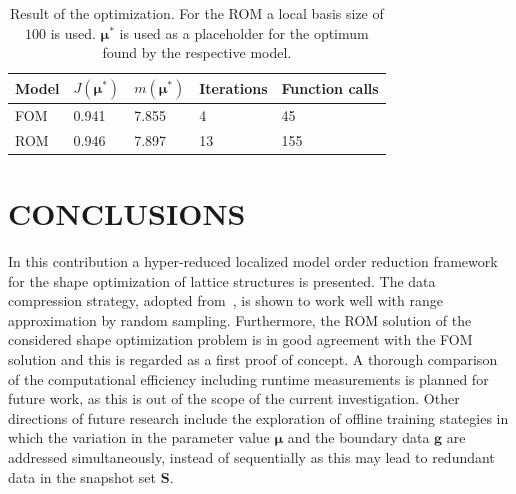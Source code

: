 \documentclass[a4paper]{eccomas_paper-2024}
\newcommand{\m}{\bm\mu}
\begin{document}
\begin{table}
    \caption{Result of the optimization. For the ROM a local basis size of $100$ is used. $\m^{\ast}$ is used as a placeholder for the optimum found by the respective model.}\label{tab:opt_result}
    \begin{center}
        \begin{tabularx}{\textwidth}{XXXXX}
            \toprule
            Model & $J(\m^{\ast})$ & $m(\m^{\ast})$ & Iterations & Function calls\\\midrule
            FOM   &  0.941         &  7.855  & 4          & 45\\
            ROM   &  0.946         &  7.897  & 13         & 155\\
            \bottomrule
        \end{tabularx}
    \end{center}
\end{table}


\section{CONCLUSIONS} %
\label{sec:conclusions}
In this contribution a hyper-reduced localized model order reduction framework for the shape optimization of lattice structures is presented.
The data compression strategy, adopted from~\cite{Taddei2018Localization}, is shown to work well with range approximation by random sampling.
Furthermore, the ROM solution of the considered shape optimization problem is in good agreement with the FOM solution and this is regarded as a first proof of concept.
A thorough comparison of the computational efficiency including runtime measurements is planned for future work, as this is out of the scope of the current investigation.
Other directions of future research include the exploration of offline training stategies in which the variation in the parameter value $\m$ and the boundary data $\bm{g}$ are addressed simultaneously, instead of sequentially as this may lead to redundant data in the snapshot set $\bm{S}$.


\printbibliography[title=REFERENCES]
\end{document}
